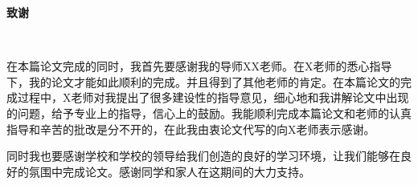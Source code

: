 
\begin{center}
	\bf\xiaosanhao 致谢
\end{center}
~

{\rm\wuhao 
	
在本篇论文完成的同时，我首先要感谢我的导师XX老师。在X老师的悉心指导下，我的论文才能如此顺利的完成。并且得到了其他老师的肯定。在本篇论文的完成过程中，X老师对我提出了很多建设性的指导意见，细心地和我讲解论文中出现的问题，给予专业上的指导，信心上的鼓励。我能顺利完成本篇论文和老师的认真指导和辛苦的批改是分不开的，在此我由衷论文代写的向X老师表示感谢。

同时我也要感谢学校和学校的领导给我们创造的良好的学习环境，让我们能够在良好的氛围中完成论文。感谢同学和家人在这期间的大力支持。

~

~



}